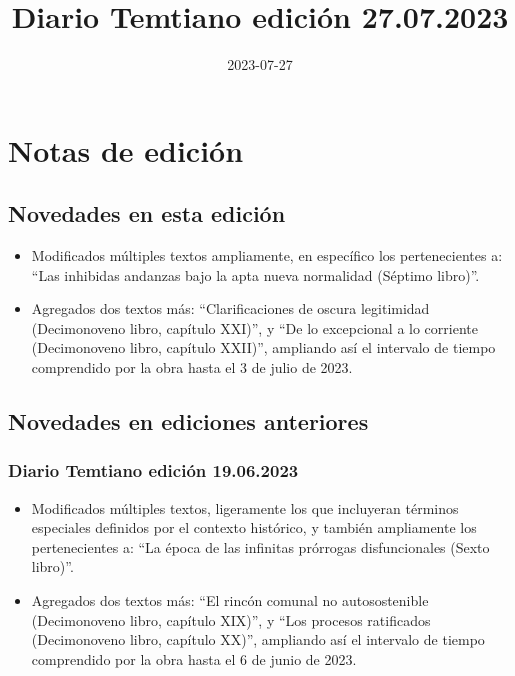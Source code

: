 \documentclass[
]{book}
\title{Diario Temtiano edición 27.07.2023}
\author{}
\date{\vspace{-2.5em}2023-07-27}
\begin{document}
\maketitle

{
\setcounter{tocdepth}{1}
\tableofcontents
}
\hypertarget{notas-de-ediciuxf3n}{%
\chapter*{Notas de edición}\label{notas-de-ediciuxf3n}}

\hypertarget{novedades-en-esta-ediciuxf3n}{%
\section*{Novedades en esta edición}\label{novedades-en-esta-ediciuxf3n}}

\begin{itemize}
\item
  Modificados múltiples textos ampliamente, en específico los pertenecientes a: ``Las inhibidas andanzas bajo la apta nueva normalidad (Séptimo libro)''.
\item
  Agregados dos textos más: ``Clarificaciones de oscura legitimidad (Decimonoveno libro, capítulo XXI)'', y ``De lo excepcional a lo corriente (Decimonoveno libro, capítulo XXII)'', ampliando así el intervalo de tiempo comprendido por la obra hasta el 3 de julio de 2023.
\end{itemize}

\hypertarget{novedades-en-ediciones-anteriores}{%
\section*{Novedades en ediciones anteriores}\label{novedades-en-ediciones-anteriores}}

\hypertarget{diario-temtiano-ediciuxf3n-19.06.2023}{%
\subsection*{Diario Temtiano edición 19.06.2023}\label{diario-temtiano-ediciuxf3n-19.06.2023}}

\begin{itemize}
\item
  Modificados múltiples textos, ligeramente los que incluyeran términos especiales definidos por el contexto histórico, y también ampliamente los pertenecientes a: ``La época de las infinitas prórrogas disfuncionales (Sexto libro)''.
\item
  Agregados dos textos más: ``El rincón comunal no autosostenible (Decimonoveno libro, capítulo XIX)'', y ``Los procesos ratificados (Decimonoveno libro, capítulo XX)'', ampliando así el intervalo de tiempo comprendido por la obra hasta el 6 de junio de 2023.
\end{itemize}
\end{document}
